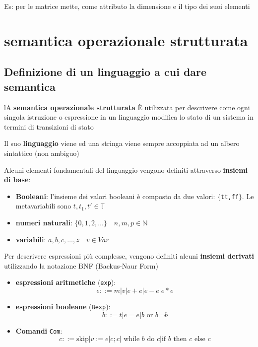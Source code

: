 Es: per le matrice mette, come attributo la dimensione e il tipo dei suoi elementi 

\section{semantica operazionale strutturata}
\subsection{Definizione di un linguaggio a cui dare semantica}
lA \textbf{semantica operazionale strutturata} È utilizzata per descrivere come ogni singola istruzione o espressione in un linguaggio modifica lo stato di un sistema in termini di transizioni di stato

Il suo \textbf{linguaggio} viene  ed una stringa viene sempre accoppiata ad un albero sintattico (non ambiguo)

Alcuni elementi fondamentali del linguaggio vengono definiti attraverso \textbf{insiemi di base}:
\begin{itemize}

    \item \textbf{Booleani}: l'insieme dei valori booleani è composto da due valori: \texttt{$\{$tt,ff$\}$}. Le metavariabili sono $t,t_1,t'\in\mathbb{T}$

    \item \textbf{numeri naturali}: $\{0,1,2,\dots\} \quad n,m,p\in\mathbb{N}$
    
    \item \textbf{variabili}: ${a,b,c,\dots, z} \quad v\in Var$
\end{itemize}

Per descrivere espressioni più complesse, vengono definiti alcuni \textbf{insiemi derivati} utilizzando la notazione BNF (Backus-Naur Form)
\begin{itemize}
    \item \textbf{espressioni aritmetiche} (\texttt{exp}):
        \[
            e::= m | v | e+e|e-e|e*e    
        \]
    \item \textbf{espressioni booleane} (\texttt{Bexp}):
    \[
        b::= t|e=e|b \text{ or } b | \lnot b    
    \]
    \item \textbf{Comandi} \texttt{Com}:
    \[
        c::=\text{skip}|v:=e |c;c|\text{ while }b\text{ do }c|\text{if }b\text{ then }c\text{ else }c    
    \]
\end{itemize}

